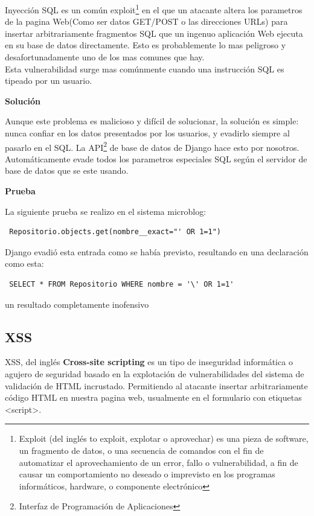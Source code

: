 Inyección SQL es un común exploit\footnote{Exploit (del inglés to exploit, explotar o aprovechar) es una pieza de software, un fragmento de datos, o una secuencia de comandos con el fin de automatizar el aprovechamiento de un error, fallo o vulnerabilidad, a fin de causar un comportamiento no deseado o imprevisto en los programas informáticos, hardware, o componente electrónico} en el que un atacante altera los parametros de la pagina Web(Como ser datos GET/POST o las direcciones URLs) para insertar arbitrariamente fragmentos SQL que un ingenuo aplicación Web ejecuta en su base de datos directamente. Esto es probablemente lo mas peligroso y desafortunadamente uno de los mas comunes que hay.\\
Esta vulnerabilidad surge mas comúnmente cuando una instrucción SQL es tipeado por un usuario.

\textbf{Solución}

Aunque este problema es malicioso y difícil de solucionar, la solución es simple: nunca confiar en los datos presentados por los usuarios, y evadirlo siempre al pasarlo en el SQL.
La API\footnote{Interfaz de Programación de Aplicaciones} de base de datos de Django hace esto por nosotros. Automáticamente evade todos los parametros especiales SQL según el servidor de base de datos que se este usando.

\textbf{Prueba}

La siguiente prueba se realizo en el sistema microblog:

\begin{verbatim}
 Repositorio.objects.get(nombre__exact="' OR 1=1")
\end{verbatim}

Django evadió esta entrada como se había previsto, resultando en una declaración como esta:

\begin{verbatim}
 SELECT * FROM Repositorio WHERE nombre = '\' OR 1=1'
\end{verbatim}

un resultado completamente inofensivo 

\subsection{XSS}

XSS, del inglés \textbf{Cross-site scripting} es un tipo de inseguridad informática o agujero de seguridad basado en la explotación de vulnerabilidades del sistema de validación de HTML incrustado. Permitiendo al atacante insertar arbitrariamente código HTML en nuestra pagina web, usualmente en el formulario con etiquetas <script>.

